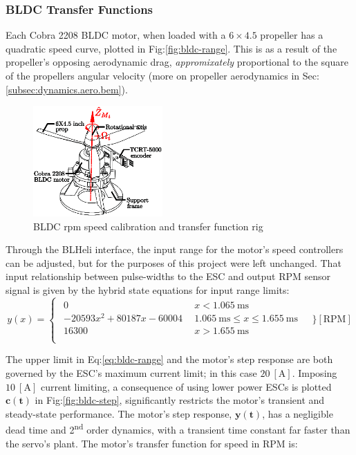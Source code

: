 \subsubsection*{BLDC Transfer Functions}
Each Cobra 2208 BLDC motor, when loaded with a $6\times4.5$ propeller has a quadratic speed curve, plotted in Fig:\ref{fig:bldc-range}. This is as a result of the propeller's opposing aerodynamic drag, \emph{appromixately} proportional to the square of the propellers angular velocity (more on propeller aerodynamics in Sec:\ref{subsec:dynamics.aero.bem}). 
\par
\begin{figure}[htb]
\centering
\includegraphics[width=0.44\textwidth]{figs/bldc-rpm}
\caption{BLDC rpm speed calibration and transfer function rig}
\label{fig:bldc-rpm}
\end{figure}
Through the BLHeli interface, the input range for the motor's speed controllers can be adjusted, but for the purposes of this project were left unchanged. That input relationship between pulse-widths to the ESC and output RPM sensor signal is given by the hybrid state equations for input range limits:
\begin{equation}
y(x)=
\begin{cases}\begin{array}{ll}
0 & ~~x<1.065~\text{ms}\\
-20593x^2 + 80187x - 60004 & ~~1.065~\text{ms} \leq x \leq 1.655~\text{ms}\\
16300 & ~~x>1.655~\text{ms}\\
\end{array}
\end{cases}
~~~\Bigg\}[\text{RPM}]
\label{eq:bldc-range}
\end{equation}
\par
The upper limit in Eq:\ref{eq:bldc-range} and the motor's step response are both governed by the ESC's maximum current limit; in this case $20~[\text{A}]$. Imposing $10~[\text{A}]$ current limiting, a consequence of using lower power ESCs is plotted {\color{YellowGreen}$\mathbf{c(t)}$} in Fig:\ref{fig:bldc-step}, significantly restricts the motor's transient and steady-state performance. The motor's step response, {\color{Purple}$\mathbf{y(t)}$}, has a negligible dead time and 2\textsuperscript{nd} order dynamics, with a transient time constant far faster than the servo's plant. The motor's transfer function for speed in RPM is:
